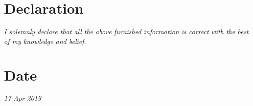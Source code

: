 \documentclass[11pt,a4paper,sans]{moderncv}        %
\begin{document}
\section{Declaration}
\emph{I solemnly declare that all the above furnished information is correct with the best of my knowledge and belief.}
\section{Date }
\emph{17-Apr-2019}
\end{document}
